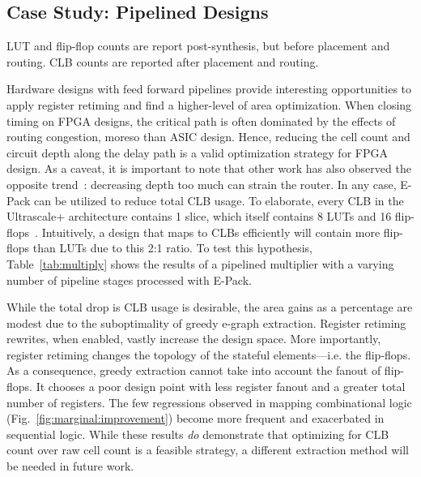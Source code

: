 \subsection{Case Study: Pipelined Designs}\label{sec:results:retiming}
\begin{table}[t]
    \centering
    \caption{LUT and flip-flop counts are report post-synthesis, but before placement and routing. CLB counts are reported after placement and routing.}\label{tab:multiply}
\end{table}

Hardware designs with feed forward pipelines provide interesting opportunities
to apply register retiming and find a higher-level of area optimization. When
closing timing on FPGA designs, the critical path is often dominated by the
effects of routing congestion, moreso than ASIC design. Hence, reducing the
cell count and circuit depth along the delay path is a valid optimization
strategy for FPGA design. As a caveat, it is important to note that other work
has also observed the opposite trend~\cite{academicfpga}: decreasing depth too
much can strain the router. In any case, E-Pack can be utilized to reduce total
CLB usage. To elaborate, every CLB in the Ultrascale+ architecture contains 1
slice, which itself contains 8 LUTs and 16 flip-flops~\cite{ug574}.
Intuitively, a design that maps to CLBs efficiently will contain more
flip-flops than LUTs due to this 2:1 ratio. To test this hypothesis,
Table~\ref{tab:multiply} shows the results of a pipelined multiplier with a
varying number of pipeline stages processed with E-Pack.

While the total drop is CLB usage is desirable, the area gains as a percentage
are modest due to the suboptimality of greedy e-graph extraction. Register
retiming rewrites, when enabled, vastly increase the design space. More
importantly, register retiming changes the topology of the stateful
elements---i.e. the flip-flops. As a consequence, greedy extraction cannot take
into account the fanout of flip-flops. It chooses a poor design point with less
register fanout and a greater total number of registers. The few regressions
observed in mapping combinational logic (Fig.~\ref{fig:marginal:improvement})
become more frequent and exacerbated in sequential logic. While these results
\textit{do} demonstrate that optimizing for CLB count over raw cell count is a
feasible strategy, a different extraction method will be needed in future work.

